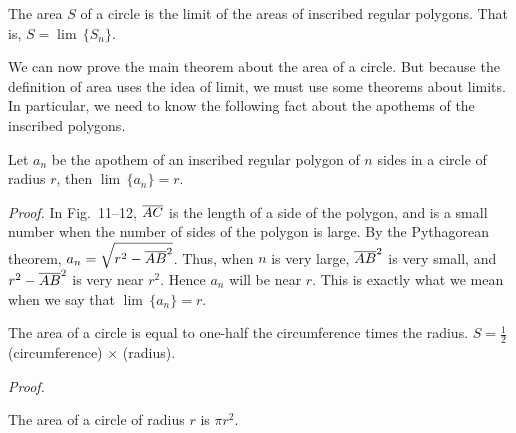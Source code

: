 \documentclass[11pt]{book}
\theoremstyle{XIplainnote}
\theoremstyle{bkplain}
\begin{document}
\begin{definition}
The area $S$ of a circle is the limit of the areas of inscribed regular
polygons. That is, $S = \lim\,\{S_n\}$.
\end{definition}

We can now prove the main theorem about the area of a circle. But because the
definition of area uses the idea of limit, we must use some theorems about
limits. In particular, we need to know the following fact about the apothems of
the inscribed polygons.

\begin{theorem}
Let $a_n$ be the apothem of an inscribed regular polygon of $n$ sides in a
circle of radius $r$, then $\lim\,\{a_n\} = r$.
\end{theorem}

\FIGXITWELVE

\noindent\emph{Proof.} In Fig.~11--12, $\overline{AC}$ is the length of a side of the
polygon, and is a small number when the number of sides of the polygon is
large. By the Pythagorean theorem, $a_n = \sqrt{r^2 - \overline{AB}^2}$. Thus, when
$n$ is very large, $\overline{AB}^2$ is very small, and $r^2 - \overline{AB}^2$ is very
near $r^2$. Hence $a_n$ will be near $r$. This is exactly what we mean when we
say that $\lim\,\{a_n\} = r$.

\begin{theorem}
The area of a circle is equal to one-half the circumference times the radius.
$S = \frac{1}{2}$ (circumference) $\times$ (radius).
\end{theorem}

\noindent\emph{Proof.}
\begin{steps}
\end{steps}

\begin{corollary}
The area of a circle of radius $r$ is $\pi r^2$.
\end{corollary}
\end{document}
